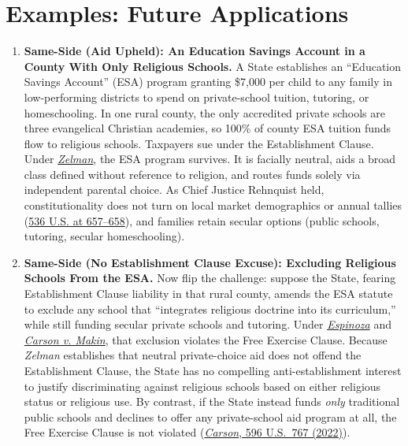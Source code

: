 \documentclass[12pt]{article}
\begin{document}
\section{Examples: Future Applications}
\begin{enumerate}

\item \textbf{Same-Side (Aid Upheld): An Education Savings Account in a County With Only Religious Schools.} A State establishes an ``Education Savings Account'' (ESA) program granting \$7,000 per child to any family in low-performing districts to spend on private-school tuition, tutoring, or homeschooling. In one rural county, the only accredited private schools are three evangelical Christian academies, so 100\% of county ESA tuition funds flow to religious schools. Taxpayers sue under the Establishment Clause. Under \href{https://supreme.justia.com/cases/federal/us/536/639/}{\emph{Zelman}}, the ESA program survives. It is facially neutral, aids a broad class defined without reference to religion, and routes funds solely via independent parental choice. As Chief Justice Rehnquist held, constitutionality does not turn on local market demographics or annual tallies (\href{https://supreme.justia.com/cases/federal/us/536/639/}{536 U.S. at 657--658}), and families retain secular options (public schools, tutoring, secular homeschooling).

\item \textbf{Same-Side (No Establishment Clause Excuse): Excluding Religious Schools From the ESA.} Now flip the challenge: suppose the State, fearing Establishment Clause liability in that rural county, amends the ESA statute to exclude any school that ``integrates religious doctrine into its curriculum,'' while still funding secular private schools and tutoring. Under \href{https://supreme.justia.com/cases/federal/us/591/18-1195/}{\emph{Espinoza}} and \href{https://supreme.justia.com/cases/federal/us/596/20-1088/}{\emph{Carson v. Makin}}, that exclusion violates the Free Exercise Clause. Because \emph{Zelman} establishes that neutral private-choice aid does not offend the Establishment Clause, the State has no compelling anti-establishment interest to justify discriminating against religious schools based on either religious status or religious use. By contrast, if the State instead funds \emph{only} traditional public schools and declines to offer any private-school aid program at all, the Free Exercise Clause is not violated (\href{https://supreme.justia.com/cases/federal/us/596/20-1088/}{\emph{Carson}, 596 U.S.\ 767 (2022)}).


\end{enumerate}
\end{document}
